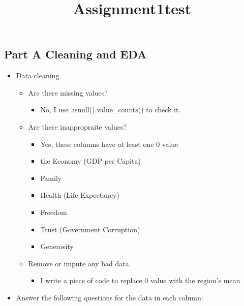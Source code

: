 \documentclass[11pt]{article}
\title{Assignment1test}
\providecommand{\tightlist}{%
      \setlength{\itemsep}{0pt}\setlength{\parskip}{0pt}}
\begin{document}
    
    
    \maketitle
    
    

    
    \subsection{Part A Cleaning and EDA}\label{part-a-cleaning-and-eda}

\begin{itemize}
\tightlist
\item
  Data cleaning

  \begin{itemize}
  \tightlist
  \item
    Are there missing values?

    \begin{itemize}
    \tightlist
    \item
      No, I use .isnull().value\_counts() to check it.
    \end{itemize}
  \item
    Are there inappropraite values?

    \begin{itemize}
    \tightlist
    \item
      Yes, these columns have at least one 0 value
    \item
      the Economy (GDP per Capita)
    \item
      Family
    \item
      Health (Life Expectancy)\\
    \item
      Freedom
    \item
      Trust (Government Corruption)
    \item
      Generosity
    \end{itemize}
  \item
    Remove or impute any bad data.

    \begin{itemize}
    \tightlist
    \item
      I write a piece of code to replace 0 value with the region's mean
    \end{itemize}
  \end{itemize}
\item
  Answer the following questions for the data in each column:


\end{itemize}
\end{document}

